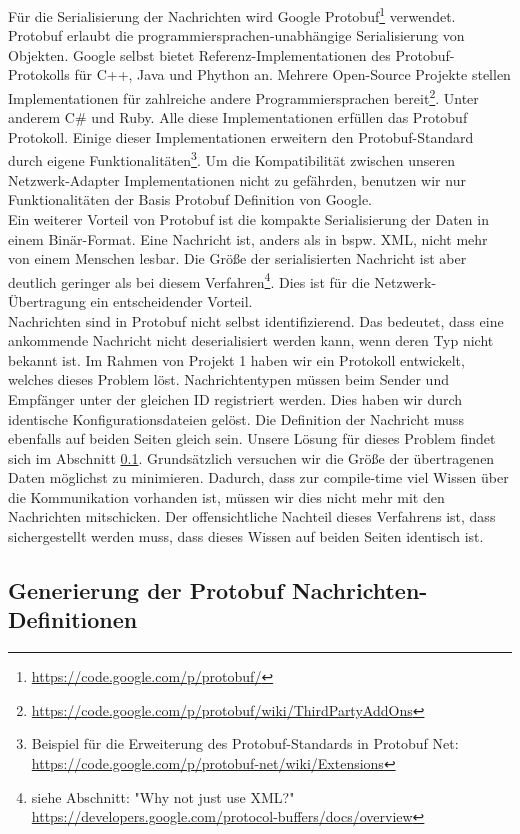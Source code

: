 Für die Serialisierung der Nachrichten wird Google Protobuf\footnote{\url{https://code.google.com/p/protobuf/}} verwendet. Protobuf erlaubt die programmiersprachen-unabhängige Serialisierung von Objekten. Google selbst bietet Referenz-Implementationen des Protobuf-Protokolls für C++, Java und Phython an. Mehrere Open-Source Projekte stellen Implementationen für zahlreiche andere Programmiersprachen bereit\footnote{\url{https://code.google.com/p/protobuf/wiki/ThirdPartyAddOns}}. Unter anderem C\# und Ruby. Alle diese Implementationen erfüllen das Protobuf Protokoll. Einige dieser Implementationen erweitern den Protobuf-Standard durch eigene Funktionalitäten\footnote{Beispiel für die Erweiterung des Protobuf-Standards in Protobuf Net: \url{https://code.google.com/p/protobuf-net/wiki/Extensions}}. Um die Kompatibilität zwischen unseren Netzwerk-Adapter Implementationen nicht zu gefährden, benutzen wir nur Funktionalitäten der Basis Protobuf Definition von Google.\\
Ein weiterer Vorteil von Protobuf ist die kompakte Serialisierung der Daten in einem Binär-Format. Eine Nachricht ist, anders als in bspw. XML, nicht mehr von einem Menschen lesbar. Die Größe der serialisierten Nachricht ist aber deutlich geringer als bei diesem Verfahren\footnote{siehe Abschnitt: "Why not just use XML?"\\ \url{https://developers.google.com/protocol-buffers/docs/overview}}. Dies ist für die Netzwerk-Übertragung ein entscheidender Vorteil.\\
Nachrichten sind in Protobuf nicht selbst identifizierend. Das bedeutet, dass eine ankommende Nachricht nicht deserialisiert werden kann, wenn deren Typ nicht bekannt ist. Im Rahmen von Projekt 1 haben wir ein Protokoll entwickelt, welches dieses Problem löst. Nachrichtentypen müssen beim Sender und Empfänger unter der gleichen ID registriert werden. Dies haben wir durch identische Konfigurationsdateien gelöst. Die Definition der Nachricht muss ebenfalls auf beiden Seiten gleich sein. Unsere Lösung für dieses Problem findet sich im Abschnitt \ref{subsec:ProtobufDefinitionGeneration}. Grundsätzlich versuchen wir die Größe der übertragenen Daten möglichst zu minimieren. Dadurch, dass zur compile-time viel Wissen über die Kommunikation vorhanden ist, müssen wir dies nicht mehr mit den Nachrichten mitschicken. Der offensichtliche Nachteil dieses Verfahrens ist, dass sichergestellt werden muss, dass dieses Wissen auf beiden Seiten identisch ist.

\subsection{Generierung der Protobuf Nachrichten-Definitionen}
\label{subsec:ProtobufDefinitionGeneration}

